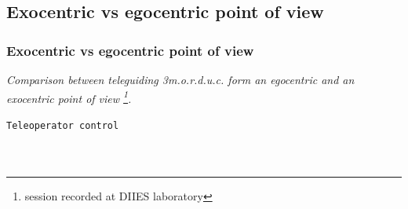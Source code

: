 \subsection{Exocentric vs egocentric point of view}
\frame
{
  \frametitle{Exocentric vs egocentric point of view}
  
  \emph{Comparison between teleguiding \textit{3m.o.r.d.u.c.}
    form an egocentric and an exocentric point of view
    \footnote{\tiny{session recorded at DIIES laboratory}}.}
  \pause

  \begin{block} {\alert{\texttt{Teleoperator control}}}

    \begin{columns}
      
       {   
      }

       {   
      }


\end{columns}
\end{block}}
